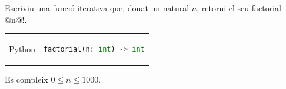 
\Statement

Escriviu una funció iterativa que, donat un natural $n$, retorni el seu factorial @n@$!$.

\Interface
\begin{tabular}{rl}
Python &
\begin{lstlisting}[language=Python]
    factorial(n: int) -> int
\end{lstlisting}
\end{tabular}

\Precondition

Es compleix $0\le n \le 1000$.

\ObservationNoMain
